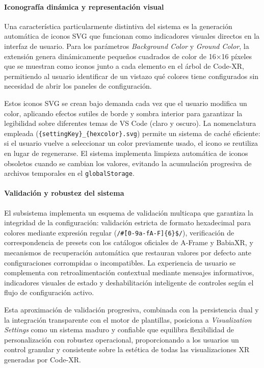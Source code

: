 \documentclass[a4paper, 12pt]{book}
\begin{document}
\paragraph{Iconografía dinámica y representación visual}
Una característica particularmente distintiva del sistema es la generación automática de iconos SVG que funcionan como indicadores visuales directos en la interfaz de usuario. Para los parámetros \emph{Background Color} y \emph{Ground Color}, la extensión genera dinámicamente pequeños cuadrados de color de 16×16 píxeles que se muestran como iconos junto a cada elemento en el árbol de Code-XR, permitiendo al usuario identificar de un vistazo qué colores tiene configurados sin necesidad de abrir los paneles de configuración.

Estos iconos SVG se crean bajo demanda cada vez que el usuario modifica un color, aplicando efectos sutiles de borde y sombra interior para garantizar la legibilidad sobre diferentes temas de VS Code (claro y oscuro). La nomenclatura empleada (\texttt{\{settingKey\}\_\{hexcolor\}.svg}) permite un sistema de caché eficiente: si el usuario vuelve a seleccionar un color previamente usado, el icono se reutiliza en lugar de regenerarse. El sistema implementa limpieza automática de iconos obsoletos cuando se cambian los valores, evitando la acumulación progresiva de archivos temporales en el \texttt{globalStorage}.

\paragraph{Validación y robustez del sistema}
El subsistema implementa un esquema de validación multicapa que garantiza la integridad de la configuración: validación estricta de formato hexadecimal para colores mediante expresión regular (\texttt{/\^\#[0-9a-fA-F]\{6\}\$/}), verificación de correspondencia de presets con los catálogos oficiales de A-Frame y BabiaXR, y mecanismos de recuperación automática que restauran valores por defecto ante configuraciones corrompidas o incompatibles. La experiencia de usuario se complementa con retroalimentación contextual mediante mensajes informativos, indicadores visuales de estado y deshabilitación inteligente de controles según el flujo de configuración activo.

Esta aproximación de validación progresiva, combinada con la persistencia dual y la integración transparente con el motor de plantillas, posiciona a \emph{Visualization Settings} como un sistema maduro y confiable que equilibra flexibilidad de personalización con robustez operacional, proporcionando a los usuarios un control granular y consistente sobre la estética de todas las visualizaciones XR generadas por Code-XR.
\end{document}
